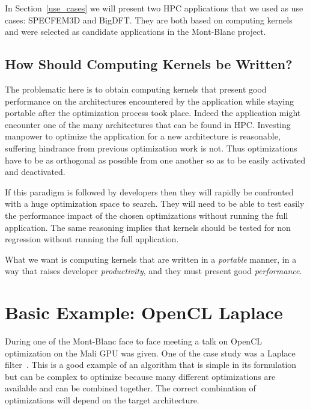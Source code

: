 \documentclass{IEEEtran}
\begin{document}
In Section~\ref{use_cases} we will present two HPC applications that we used as
use cases: SPECFEM3D and BigDFT. They are both based on computing kernels and
were selected as candidate applications in the Mont-Blanc project.

\subsection{How Should Computing Kernels be Written?}

The problematic here is to obtain computing kernels that present good
performance on the architectures encountered by the application while staying
portable after the optimization process took place. Indeed the application
might encounter one of the many architectures that can be found in HPC.
Investing manpower to optimize the application for a new architecture is
reasonable, suffering hindrance from previous optimization work is not. Thus
optimizations have to be as orthogonal as possible from one another so as to be
easily activated and deactivated.

If this paradigm is followed by developers then they will rapidly be confronted
with a huge optimization space to search. They will need to be able to test
easily the performance impact of the chosen optimizations without running the
full application. The same reasoning implies that kernels should be tested for
non regression without running the full application.

What we want is computing kernels that are written in a \emph{portable} manner,
in a way that raises developer \emph{productivity}, and they must present good
\emph{performance}.

\section{Basic Example: OpenCL Laplace\label{sec:laplace}}

During one of the Mont-Blanc face to face meeting a talk on OpenCL optimization
on the Mali GPU was given. One of the case study was a Laplace
filter~\cite{opencl_arm_training}. This is a good example of an algorithm that
is simple in its formulation but can be complex to optimize because many
different optimizations are available and can be combined together. The correct
combination of optimizations will depend on the target architecture.

\end{document}
